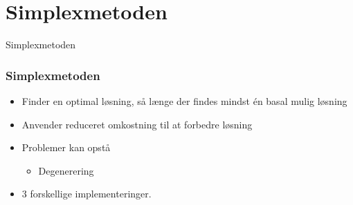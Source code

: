 
\section{Simplexmetoden}
\begin{frame}
\centering
\Huge
Simplexmetoden
\end{frame}
%
\begin{frame}
\frametitle{Simplexmetoden}
\begin{itemize}
\item Finder en optimal løsning, så længe der findes mindst én basal mulig løsning
\item Anvender reduceret omkostning til at forbedre løsning
\item Problemer kan opstå
\begin{itemize}
\item Degenerering
\end{itemize}
\item 3 forskellige implementeringer.
\end{itemize}
\end{frame}